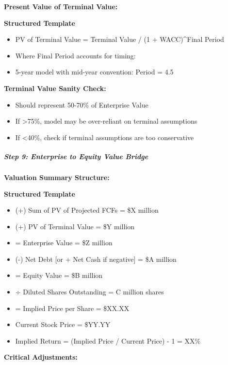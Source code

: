 \documentclass[11pt]{article}
\begin{document}
\textbf{Present Value of Terminal Value:}

\textbf{Structured Template}
\begin{itemize}[leftmargin=*,itemsep=2pt,topsep=2pt]
\item {} PV of Terminal Value = Terminal Value / (1 + WACC)\textasciicircum{}Final Period
\item {} Where Final Period accounts for timing:
\item {} 5-year model with mid-year convention: Period = 4.5
\end{itemize}

\textbf{Terminal Value Sanity Check:}

\begin{itemize}[leftmargin=*,itemsep=2pt,topsep=2pt]
\item {} Should represent 50-70\% of Enterprise Value
\item {} If >75\%, model may be over-reliant on terminal assumptions
\item {} If <40\%, check if terminal assumptions are too conservative
\end{itemize}

\subparagraph{Step 9: Enterprise to Equity Value Bridge}\mbox{}\par

\textbf{Valuation Summary Structure:}


\textbf{Structured Template}
\begin{itemize}[leftmargin=*,itemsep=2pt,topsep=2pt]
\item {} (+) Sum of PV of Projected FCFs = \$X million
\item {} (+) PV of Terminal Value = \$Y million
\item {} = Enterprise Value = \$Z million
\item {} (-) Net Debt [or + Net Cash if negative] = \$A million
\item {} = Equity Value = \$B million
\item {} ÷ Diluted Shares Outstanding = C million shares
\item {} = Implied Price per Share = \$XX.XX
\item {} Current Stock Price = \$YY.YY
\item {} Implied Return = (Implied Price / Current Price) - 1 = XX\%
\end{itemize}

\textbf{Critical Adjustments:}
\end{document}
